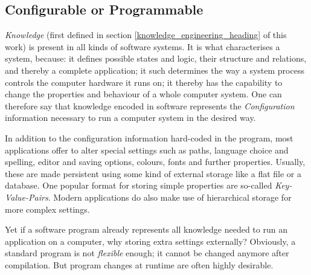 %
%
%
%
%
%
%

\subsection{Configurable or Programmable}
\label{configurable_or_programmable_heading}

\emph{Knowledge} (first defined in section \ref{knowledge_engineering_heading}
of this work) is present in all kinds of software systems. It is what
characterises a system, because: it defines possible states and logic, their
structure and relations, and thereby a complete application; it such determines
the way a system process controls the computer hardware it runs on; it thereby
has the capability to change the properties and behaviour of a whole computer
system. One can therefore say that knowledge encoded in software represents the
\emph{Configuration} information necessary to run a computer system in the
desired way.

In addition to the configuration information hard-coded in the program, most
applications offer to alter special settings such as paths, language choice and
spelling, editor and saving options, colours, fonts and further properties.
Usually, these are made persistent using some kind of external storage like a
flat file or a database. One popular format for storing simple properties are
so-called \emph{Key-Value-Pairs}. Modern applications do also make use of
hierarchical storage for more complex settings.

Yet if a software program already represents all knowledge needed to run an
application on a computer, why storing extra settings externally? Obviously, a
standard program is not \emph{flexible} enough; it cannot be changed anymore
after compilation. But program changes at runtime are often highly desirable.

